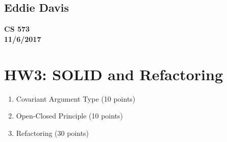 \documentclass{report}
\begin{document}
\subsection*{Eddie Davis}
\textbf{CS 573}\\
\textbf{11/6/2017}\\

\section*{HW3: SOLID and Refactoring}

\begin{enumerate}
	\item Covariant Argument Type (10 points)
	
	\item Open-Closed Principle (10 points) 

	\item Refactoring (30 points)

\end{enumerate}
\end{document}
